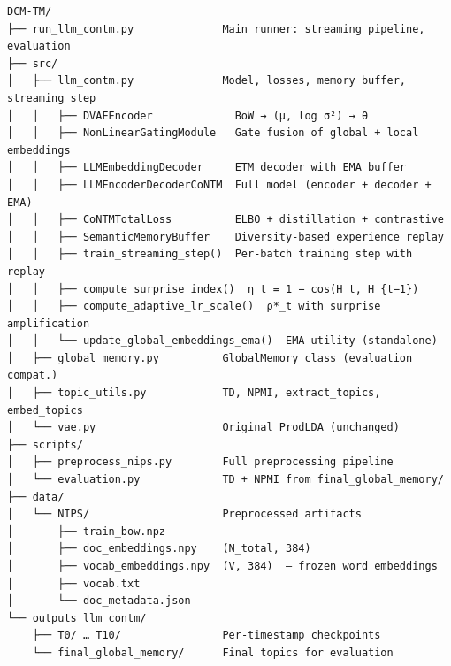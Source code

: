 \documentclass[11pt,a4paper]{article}
\begin{document}
\begin{verbatim}
DCM-TM/
├── run_llm_contm.py              Main runner: streaming pipeline, evaluation
├── src/
│   ├── llm_contm.py              Model, losses, memory buffer, streaming step
│   │   ├── DVAEEncoder             BoW → (μ, log σ²) → θ
│   │   ├── NonLinearGatingModule   Gate fusion of global + local embeddings
│   │   ├── LLMEmbeddingDecoder     ETM decoder with EMA buffer
│   │   ├── LLMEncoderDecoderCoNTM  Full model (encoder + decoder + EMA)
│   │   ├── CoNTMTotalLoss          ELBO + distillation + contrastive
│   │   ├── SemanticMemoryBuffer    Diversity-based experience replay
│   │   ├── train_streaming_step()  Per-batch training step with replay
│   │   ├── compute_surprise_index()  η_t = 1 − cos(H_t, H_{t−1})
│   │   ├── compute_adaptive_lr_scale()  ρ*_t with surprise amplification
│   │   └── update_global_embeddings_ema()  EMA utility (standalone)
│   ├── global_memory.py          GlobalMemory class (evaluation compat.)
│   ├── topic_utils.py            TD, NPMI, extract_topics, embed_topics
│   └── vae.py                    Original ProdLDA (unchanged)
├── scripts/
│   ├── preprocess_nips.py        Full preprocessing pipeline
│   └── evaluation.py             TD + NPMI from final_global_memory/
├── data/
│   └── NIPS/                     Preprocessed artifacts
│       ├── train_bow.npz
│       ├── doc_embeddings.npy    (N_total, 384)
│       ├── vocab_embeddings.npy  (V, 384)  — frozen word embeddings
│       ├── vocab.txt
│       └── doc_metadata.json
└── outputs_llm_contm/
    ├── T0/ … T10/                Per-timestamp checkpoints
    └── final_global_memory/      Final topics for evaluation
\end{verbatim}
\end{document}
